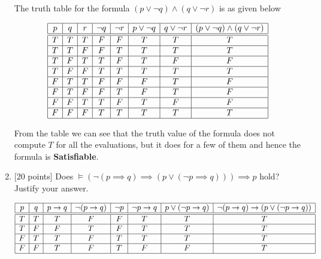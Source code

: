 \documentclass{article}
\begin{document}
\begin{enumerate}
\begin{answer}
		The truth table for the formula $(p \lor \neg q) \land (q \lor \neg r)$ is as
		given below
	
		\begin{displaymath}
  			\begin{array}[t]{|c|c|c|c|c|c|c|c|} \hline
    			p & q & r & \neg q & \neg r & p \lor \neg q & q \lor \neg r & (p \lor
    			\neg q) \land (q \lor \neg r) \\ \hline\hline 
    			T & T & T & F & F & T & T & T\\ \hline
    			T & T & F & F & T & T & T & T\\ \hline
    			T & F & T & T & F & T & F & F\\ \hline
  		 		T & F & F & T & T & T & T & T\\ \hline
  		 		F & T & T & F & F & F & T & F\\ \hline
    			F & T & F & F & T & F & T & F\\ \hline
    			F & F & T & T & F & T & F & F\\ \hline
  	 			F & F & F & T & T & T & T & T\\ \hline
  			\end{array}
  		\end{displaymath}
  		
  		From the table we can see that the truth value of the formula does not
  		compute $T$ for all the evaluations, but it does for a few of them and hence
  		the formula is \textbf{Satisfiable}.
  	
	\end{answer}

\item {[20 points]} Does $\models (\neg(p \implies q) \implies (p
  \lor (\neg p \implies q))) \implies p$ hold?  Justify your answer.

	\begin{answer}
		
		\begin{displaymath}
  			\begin{array}[t]{|c|c|c|c|c|c|c|c|} \hline
    			p & q & p \implies q & \neg (p \implies q) & \neg p & \neg p \implies q &
    			p \lor (\neg p \implies q) & \neg (p \implies q) \implies (p \lor (\neg
    			p \implies q)) \\ \hline\hline 
    			T & T & T & F & F & T & T & T \\ \hline 
    			T & F & F & T & F & T & T & T \\ \hline 
    			F & T & T & F & T & T & T & T \\ \hline
  	 			F & F & T & F & T & F & F & T \\ \hline
  			\end{array}
  		\end{displaymath}
  		

\end{answer}
\end{enumerate}
\end{document}

